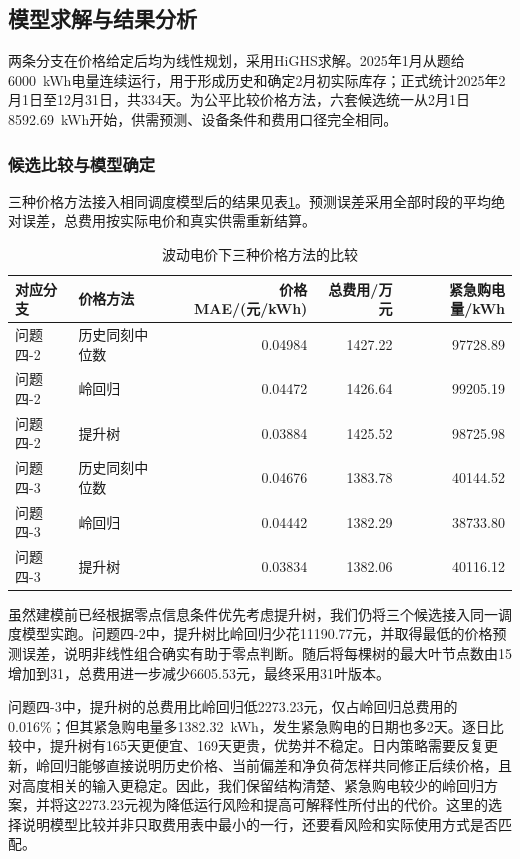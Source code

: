 \subsection{模型求解与结果分析}

两条分支在价格给定后均为线性规划，采用HiGHS求解。2025年1月从题给6000~kWh电量连续运行，用于形成历史和确定2月初实际库存；正式统计2025年2月1日至12月31日，共334天。为公平比较价格方法，六套候选统一从2月1日8592.69~kWh开始，供需预测、设备条件和费用口径完全相同。

\subsubsection{候选比较与模型确定}

三种价格方法接入相同调度模型后的结果见表\ref{tab:q4compare}。预测误差采用全部时段的平均绝对误差，总费用按实际电价和真实供需重新结算。

\begin{table}[htbp]
\centering\small
\caption{波动电价下三种价格方法的比较}
\label{tab:q4compare}
\begin{tabular}{llrrr}
\toprule
对应分支 & 价格方法 & 价格MAE/(元/kWh) & 总费用/万元 & 紧急购电量/kWh \\
\midrule
问题四-2 & 历史同刻中位数 & 0.04984 & 1427.22 & 97728.89 \\
问题四-2 & 岭回归 & 0.04472 & 1426.64 & 99205.19 \\
问题四-2 & 提升树 & 0.03884 & 1425.52 & 98725.98 \\
问题四-3 & 历史同刻中位数 & 0.04676 & 1383.78 & 40144.52 \\
问题四-3 & 岭回归 & 0.04442 & 1382.29 & 38733.80 \\
问题四-3 & 提升树 & 0.03834 & 1382.06 & 40116.12 \\
\bottomrule
\end{tabular}
\end{table}

虽然建模前已经根据零点信息条件优先考虑提升树，我们仍将三个候选接入同一调度模型实跑。问题四-2中，提升树比岭回归少花11190.77元，并取得最低的价格预测误差，说明非线性组合确实有助于零点判断。随后将每棵树的最大叶节点数由15增加到31，总费用进一步减少6605.53元，最终采用31叶版本。

问题四-3中，提升树的总费用比岭回归低2273.23元，仅占岭回归总费用的0.016\%；但其紧急购电量多1382.32~kWh，发生紧急购电的日期也多2天。逐日比较中，提升树有165天更便宜、169天更贵，优势并不稳定。日内策略需要反复更新，岭回归能够直接说明历史价格、当前偏差和净负荷怎样共同修正后续价格，且对高度相关的输入更稳定。因此，我们保留结构清楚、紧急购电较少的岭回归方案，并将这2273.23元视为降低运行风险和提高可解释性所付出的代价。这里的选择说明模型比较并非只取费用表中最小的一行，还要看风险和实际使用方式是否匹配。

